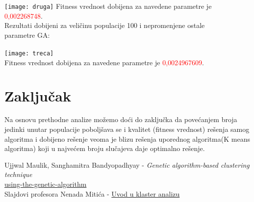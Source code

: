 \documentclass[]{article}
\begin{document}
	\texttt{[image: druga]}
	Fitness vrednost dobijena za navedene parametre je
	\textcolor{red}{0,002268748}.\\
	\newpage
	Rezultati dobijeni za veličinu populacije 100  i nepromenjene ostale \\ parametre GA:\\ \\
	\texttt{[image: treca]}
	\vspace{0.5cm}\\Fitness vrednost dobijena za navedene parametre je \textcolor{red}{0,0024967609}. \\
	
	\section{Zaklju\v{c}ak}
	Na osnovu prethodne analize možemo doći do zaključka da povećanjem broja jedinki unutar populacije poboljšava se i kvalitet (fitness vrednost) rešenja samog algoritma i dobijeno rešenje veoma je blizu rešenja uporednog algoritma(K means algoritma)  koji  u najvećem broju slučajeva daje optimalno rešenje.
	
	\newpage
	
	\begin{thebibliography}{9} 
		Ujjwal Maulik, Sanghamitra Bandyopadhyay - 
		\textit{Genetic algorithm-based clustering technique}\\
		\href{https://blog.paperspace.com/clustering-using-the-genetic-algorithm/}{using-the-genetic-algorithm}\\
		Slajdovi profesora Nenada Mitića - 
		\href{http://poincare.matf.bg.ac.rs/~nenad/ip1/13.uvod_u_klaster_analizu.pdf}{Uvod u klaster analizu}
		
	\end{thebibliography}
	
	
	
	
\end{document}
